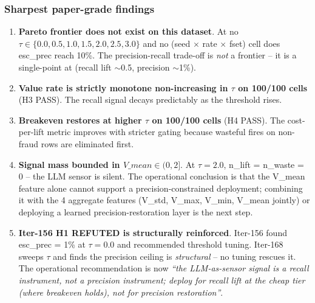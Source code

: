 \subsubsection{Sharpest paper-grade findings}
\begin{enumerate}
\item \textbf{Pareto frontier does not exist on this dataset}. At no
$\tau \in \{0.0, 0.5, 1.0, 1.5, 2.0, 2.5, 3.0\}$ and no (seed $\times$
rate $\times$ fset) cell does esc\_prec reach 10\%. The
precision-recall trade-off is \emph{not} a frontier -- it is a
single-point at (recall lift $\sim$0.5, precision $\sim$1\%).
\item \textbf{Value rate is strictly monotone non-increasing in $\tau$
on 100/100 cells} (H3 PASS). The recall signal decays predictably as
the threshold rises.
\item \textbf{Breakeven restores at higher $\tau$ on 100/100 cells}
(H4 PASS). The cost-per-lift metric improves with stricter gating
because wasteful fires on non-fraud rows are eliminated first.
\item \textbf{Signal mass bounded in $V\_mean \in (0, 2]$}. At
$\tau = 2.0$, n\_lift = n\_waste = 0 -- the LLM sensor is silent. The
operational conclusion is that the V\_mean feature alone cannot
support a precision-constrained deployment; combining it with the 4
aggregate features (V\_std, V\_max, V\_min, V\_mean jointly) or
deploying a learned precision-restoration layer is the next step.
\item \textbf{Iter-156 H1 REFUTED is structurally reinforced}.
Iter-156 found esc\_prec = 1\% at $\tau = 0.0$ and recommended
threshold tuning. Iter-168 sweeps $\tau$ and finds the precision
ceiling is \emph{structural} -- no tuning rescues it. The
operational recommendation is now \emph{``the LLM-as-sensor signal
is a recall instrument, not a precision instrument; deploy for
recall lift at the cheap tier (where breakeven holds), not for
precision restoration''}.
\end{enumerate}

